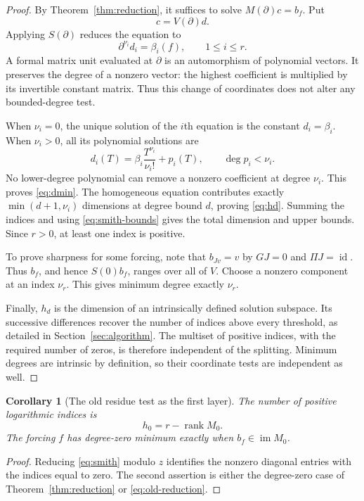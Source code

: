 \documentclass[11pt,a4paper]{article}
\numberwithin{equation}{section}
\newtheorem{corollary}[theorem]{Corollary}
\theoremstyle{definition}
\theoremstyle{remark}
\theoremstyle{definition}
\newcommand{\im}{\operatorname{im}}
\newcommand{\rank}{\operatorname{rank}}
\newcommand{\Id}{\operatorname{id}}
\begin{document}
\begin{proof}
By Theorem~\ref{thm:reduction}, it suffices to solve $M(\partial)c=b_f$. Put
\[
 c=V(\partial)d.
\]
Applying $S(\partial)$ reduces the equation to
\begin{equation}
 \partial^{\nu_i}d_i=\beta_i(f),\qquad 1\le i\le r.
 \label{eq:diagonal-equations}
\end{equation}
A formal matrix unit evaluated at $\partial$ is an automorphism of polynomial vectors. It preserves the degree of a nonzero vector: the highest coefficient is multiplied by its invertible constant matrix. Thus this change of coordinates does not alter any bounded-degree test.

When $\nu_i=0$, the unique solution of the $i$th equation is the constant $d_i=\beta_i$. When $\nu_i>0$, all its polynomial solutions are
\begin{equation}
 d_i(T)=\beta_i\frac{T^{\nu_i}}{\nu_i!}+p_i(T),
 \qquad \deg p_i<\nu_i.
 \label{eq:diagonal-solutions}
\end{equation}
No lower-degree polynomial can remove a nonzero coefficient at degree $\nu_i$. This proves \eqref{eq:dmin}. The homogeneous equation contributes exactly $\min(d+1,\nu_i)$ dimensions at degree bound $d$, proving \eqref{eq:hd}. Summing the indices and using \eqref{eq:smith-bounds} gives the total dimension and upper bounds. Since $r>0$, at least one index is positive.

To prove sharpness for some forcing, note that $b_{Jv}=v$ by $GJ=0$ and $\Pi J=\Id$. Thus $b_f$, and hence $S(0)b_f$, ranges over all of $V$. Choose a nonzero component at an index $\nu_r$. This gives minimum degree exactly $\nu_r$.

Finally, $h_d$ is the dimension of an intrinsically defined solution subspace. Its successive differences recover the number of indices above every threshold, as detailed in Section~\ref{sec:algorithm}. The multiset of positive indices, with the required number of zeros, is therefore independent of the splitting. Minimum degrees are intrinsic by definition, so their coordinate tests are independent as well.
\end{proof}

\begin{corollary}[The old residue test as the first layer]
\label{cor:old-layer}
The number of positive logarithmic indices is
\[
 h_0=r-\rank M_0.
\]
The forcing $f$ has degree-zero minimum exactly when $b_f\in\im M_0$.
\end{corollary}
\begin{proof}
Reducing \eqref{eq:smith} modulo $z$ identifies the nonzero diagonal entries with the indices equal to zero. The second assertion is either the degree-zero case of Theorem~\ref{thm:reduction} or \eqref{eq:old-reduction}.
\end{proof}
\end{document}
